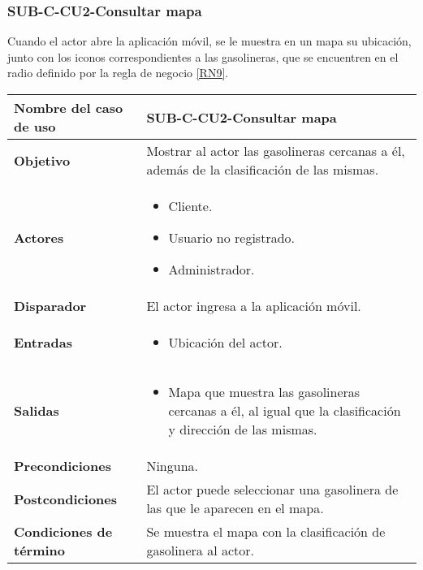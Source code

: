\subsubsection{SUB-C-CU2-Consultar mapa}\label{SUB-C-CU2}
Cuando el actor abre la aplicación móvil, se le muestra en un mapa su ubicación, junto con los iconos correspondientes a las gasolineras, que se encuentren en el radio definido por la regla de negocio \ref{RN9}.

\begin{longtable}{|J{5cm}|J{10.3cm}|}
	\hline
	\textbf{Nombre del caso de uso} &
		SUB-C-CU2-Consultar mapa \\ \hline
	\textbf{Objetivo} &
		Mostrar al actor las gasolineras cercanas a él, además de la clasificación de las mismas. \\ \hline
	\textbf{Actores} &
		\begin{itemize}
			\item Cliente.
			\item Usuario no registrado.
			\item Administrador.
		\end{itemize}
		 \\ \hline 
	\textbf{Disparador} & 
		El actor ingresa a la aplicación móvil. \\ \hline
	\textbf{Entradas} & 
		\begin{itemize}
				\item Ubicación del actor.
		\end{itemize}\\ \hline 
	\textbf{Salidas} & 
		\begin{itemize}
			\item Mapa que muestra las gasolineras cercanas a él, al igual que la clasificación y dirección de las mismas.
		\end{itemize} \\ \hline
	\textbf{Precondiciones} &
		Ninguna.\\ \hline
	\textbf{Postcondiciones} & El actor puede seleccionar una gasolinera de las que le aparecen en el mapa.
		\\ \hline
	\textbf{Condiciones de término} & Se muestra el mapa con la clasificación de gasolinera al actor.

\end{longtable}
